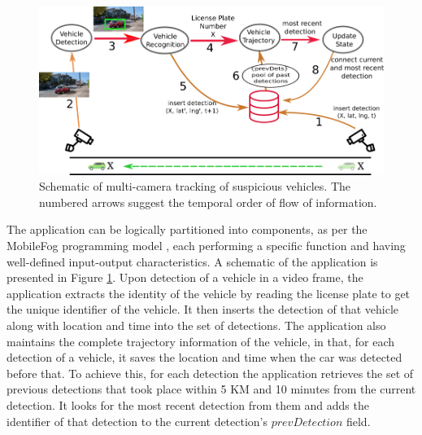 \begin{figure}
\includegraphics[width=\columnwidth]{figures/fogstore/vehicleTrackingFlow.png}
\caption{Schematic of multi-camera tracking of suspicious vehicles. The numbered arrows suggest the temporal order of flow of information.}
\label{fig:usecase-schematic}
\end{figure}

\par The application can be logically partitioned into components, as per the MobileFog programming model \cite{mobilefog}, each performing a specific function and having well-defined input-output characteristics. A schematic of the application is presented in Figure \ref{fig:usecase-schematic}. Upon detection of a vehicle in a video frame, the application extracts the identity of the vehicle by reading the license plate to get the unique identifier of the vehicle. It then inserts the detection of that vehicle along with location and time into the set of detections. The application also maintains the complete trajectory information of the vehicle, in that, for each detection of a vehicle, it saves the location and time when the car was detected before that. To achieve this, for each detection the application retrieves the set of previous detections that took place within 5 KM and 10 minutes from the current detection. It looks for the most recent detection from them and adds the identifier of that detection to the current detection's $prevDetection$ field.

